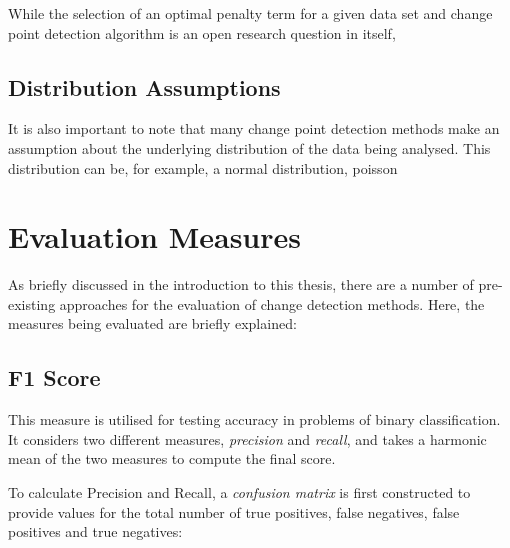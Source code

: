 \documentclass{uvamscse}	%
\begin{document}
While the selection of an optimal penalty term for a given data set and change point detection algorithm is an open research question in itself, 

\subsection{Distribution Assumptions}

It is also important to note that many change point detection methods make an assumption about the underlying distribution of the data being analysed. This distribution can be, for example, a normal distribution, poisson 

\section{Evaluation Measures}

As briefly discussed in the introduction to this thesis, there are a number of pre-existing approaches for the evaluation of change detection methods. Here, the measures being evaluated are briefly explained:

\subsection{F1 Score}

 This measure is utilised for testing accuracy in problems of binary classification. It considers two different measures, \emph{precision} and \emph{recall}, and takes a harmonic mean of the two measures to compute the final score.
	
	To calculate Precision and Recall, a \emph{confusion matrix} is first constructed to provide values for the total number of true positives, false negatives, false positives and true negatives:
	
\end{document}
